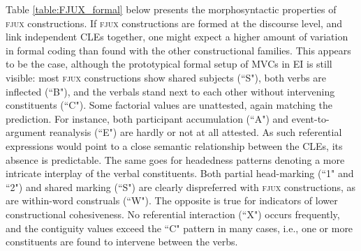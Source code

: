 Table \ref{table:FJUX_formal} below presents the morphosyntactic properties of \textsc{fjux} constructions. If \textsc{fjux} constructions are formed at the discourse level, and link independent CLEs together, one might expect a higher amount of variation in formal coding than found with the other constructional families. This appears to be the case, although the prototypical formal setup of MVCs in EI is still visible: most \textsc{fjux} constructions show shared subjects (``S"), both verbs are inflected (``B"), and the verbals stand next to each other without intervening constituents (``C"). Some factorial values are unattested, again matching the prediction. For instance, both participant accumulation (``A") and event-to-argument reanalysis (``E") are hardly or not at all attested. As such referential expressions would point to a close semantic relationship between the CLEs, its absence is predictable. The same goes for headedness patterns denoting a more intricate interplay of the verbal constituents. Both partial head-marking (``1" and ``2") and shared marking (``S") are clearly dispreferred with \textsc{fjux} constructions, as are within-word construals (``W"). The opposite is true for indicators of lower constructional cohesiveness. No referential interaction (``X") occurs frequently, and the contiguity values exceed the ``C" pattern in many cases, i.e., one or more constituents are found to intervene between the verbs.

